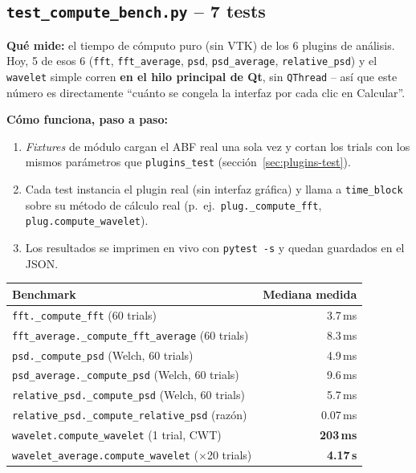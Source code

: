 \documentclass[11pt,a4paper]{article}
\begin{document}
\subsection{\texttt{test\_\allowbreak compute\_\allowbreak bench.py} -- 7 tests}

\textbf{Qué mide:} el tiempo de cómputo puro (sin VTK) de los 6 plugins de análisis. Hoy, 5 de esos 6
(\texttt{fft}, \texttt{fft\_\allowbreak average}, \texttt{psd}, \texttt{psd\_\allowbreak average}, \texttt{relative\_\allowbreak psd}) y el
\texttt{wavelet} simple corren \textbf{en el hilo principal de Qt}, sin \texttt{QThread} -- así que este
número es directamente ``cuánto se congela la interfaz por cada clic en Calcular''.

\textbf{Cómo funciona, paso a paso:}
\begin{enumerate}
  \item \textit{Fixtures} de módulo cargan el ABF real una sola vez y cortan los trials con los mismos
        parámetros que \texttt{plugins\_\allowbreak test} (sección~\ref{sec:plugins-test}).
  \item Cada test instancia el plugin real (sin interfaz gráfica) y llama a \texttt{time\_\allowbreak block} sobre su
        método de cálculo real (p.\ ej.\ \texttt{plug.\_\allowbreak compute\_\allowbreak fft}, \texttt{plug.compute\_\allowbreak wavelet}).
  \item Los resultados se imprimen en vivo con \texttt{pytest -s} y quedan guardados en el JSON.
\end{enumerate}

\begin{center}
\begin{tabular}{lr}
\toprule
\textbf{Benchmark} & \textbf{Mediana medida} \\
\midrule
\texttt{fft.\_\allowbreak compute\_\allowbreak fft} (60 trials) & 3.7\,ms \\
\texttt{fft\_\allowbreak average.\_\allowbreak compute\_\allowbreak fft\_\allowbreak average} (60 trials) & 8.3\,ms \\
\texttt{psd.\_\allowbreak compute\_\allowbreak psd} (Welch, 60 trials) & 4.9\,ms \\
\texttt{psd\_\allowbreak average.\_\allowbreak compute\_\allowbreak psd} (Welch, 60 trials) & 9.6\,ms \\
\texttt{relative\_\allowbreak psd.\_\allowbreak compute\_\allowbreak psd} (Welch, 60 trials) & 5.7\,ms \\
\texttt{relative\_\allowbreak psd.\_\allowbreak compute\_\allowbreak relative\_\allowbreak psd} (razón) & 0.07\,ms \\
\texttt{wavelet.compute\_\allowbreak wavelet} (1 trial, CWT) & \textbf{203\,ms} \\
\texttt{wavelet\_\allowbreak average.compute\_\allowbreak wavelet} ($\times$20 trials) & \textbf{4.17\,s} \\
\bottomrule
\end{tabular}
\end{center}
\end{document}
